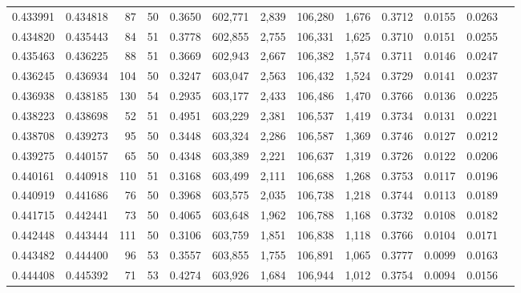\begin{tabular}{rrrrrrrrrrrrr}
0.433991 & 0.434818 &    87 &  50 &                                     0.3650 & 602,771 &   2,839 & 106,280 &   1,676 & 0.3712 & 0.0155 & 0.0263 \\
0.434820 & 0.435443 &    84 &  51 &                                     0.3778 & 602,855 &   2,755 & 106,331 &   1,625 & 0.3710 & 0.0151 & 0.0255 \\
0.435463 & 0.436225 &    88 &  51 &                                     0.3669 & 602,943 &   2,667 & 106,382 &   1,574 & 0.3711 & 0.0146 & 0.0247 \\
0.436245 & 0.436934 &   104 &  50 &                                     0.3247 & 603,047 &   2,563 & 106,432 &   1,524 & 0.3729 & 0.0141 & 0.0237 \\
0.436938 & 0.438185 &   130 &  54 &                                     0.2935 & 603,177 &   2,433 & 106,486 &   1,470 & 0.3766 & 0.0136 & 0.0225 \\
0.438223 & 0.438698 &    52 &  51 &                                     0.4951 & 603,229 &   2,381 & 106,537 &   1,419 & 0.3734 & 0.0131 & 0.0221 \\
0.438708 & 0.439273 &    95 &  50 &                                     0.3448 & 603,324 &   2,286 & 106,587 &   1,369 & 0.3746 & 0.0127 & 0.0212 \\
0.439275 & 0.440157 &    65 &  50 &                                     0.4348 & 603,389 &   2,221 & 106,637 &   1,319 & 0.3726 & 0.0122 & 0.0206 \\
0.440161 & 0.440918 &   110 &  51 &                                     0.3168 & 603,499 &   2,111 & 106,688 &   1,268 & 0.3753 & 0.0117 & 0.0196 \\
0.440919 & 0.441686 &    76 &  50 &                                     0.3968 & 603,575 &   2,035 & 106,738 &   1,218 & 0.3744 & 0.0113 & 0.0189 \\
0.441715 & 0.442441 &    73 &  50 &                                     0.4065 & 603,648 &   1,962 & 106,788 &   1,168 & 0.3732 & 0.0108 & 0.0182 \\
0.442448 & 0.443444 &   111 &  50 &                                     0.3106 & 603,759 &   1,851 & 106,838 &   1,118 & 0.3766 & 0.0104 & 0.0171 \\
0.443482 & 0.444400 &    96 &  53 &                                     0.3557 & 603,855 &   1,755 & 106,891 &   1,065 & 0.3777 & 0.0099 & 0.0163 \\
0.444408 & 0.445392 &    71 &  53 &                                     0.4274 & 603,926 &   1,684 & 106,944 &   1,012 & 0.3754 & 0.0094 & 0.0156 \\

\end{tabular}
